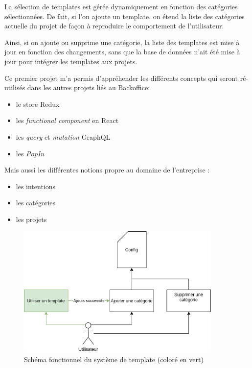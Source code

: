 \documentclass[12pt,a4paper,oneside]{scrreprt}
\begin{document}
\begin{result}
	La sélection de templates est gérée dynamiquement en fonction des catégories sélectionnées. De fait, si l'on ajoute un template, on étend la liste des catégories actuelle du projet de façon à reproduire le comportement de l'utilisateur.

	Ainsi, si on ajoute ou supprime une catégorie, la liste des templates est mise à jour en fonction des changements, sans que la base de données n'ait été mise à jour pour intégrer les templates aux projets.
\end{result}

\begin{info}
	Ce premier projet m'a permis d'appréhender les différents concepts qui seront ré-utilisés dans les autres projets liés au Backoffice:
	\begin{itemize}
		\item le store Redux
		\item les \textit{functional component} en React
		\item les \textit{query} et \textit{mutation} GraphQL
		\item les \textit{PopIn}
	\end{itemize}

	Mais aussi les différentes notions propre au domaine de l'entreprise :
	\begin{itemize}
		\item les intentions
		\item les catégories
		\item les projets
	\end{itemize}
\end{info}

\begin{figure}[!ht]
	\centering
	\includegraphics[width=0.9\textwidth]{pictures/diag_template}
	\caption{Schéma fonctionnel du système de template (coloré en vert)}
\end{figure}
\end{document}
